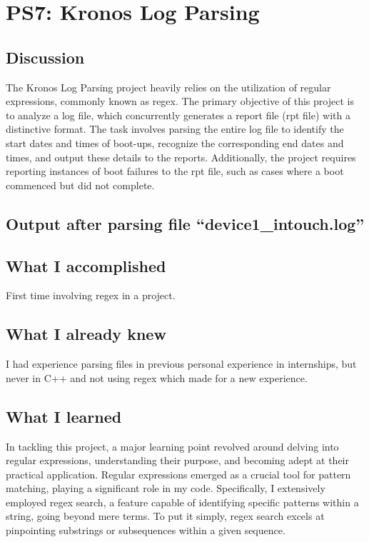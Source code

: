 \section{PS7: Kronos Log Parsing}\label{sec:ps7}

\subsection{Discussion}\label{sec:ps7:disc}

The Kronos Log Parsing project heavily relies on the utilization of regular expressions, commonly known as regex. The primary objective of this project is to analyze a log file, which concurrently generates a report file (rpt file) with a distinctive format. The task involves parsing the entire log file to identify the start dates and times of boot-ups, recognize the corresponding end dates and times, and output these details to the reports. Additionally, the project requires reporting instances of boot failures to the rpt file, such as cases where a boot commenced but did not complete.

\subsection{Output after parsing file ``device1\_intouch.log''}\label{sec:ps7:output}



\subsection{What I accomplished}\label{sec:ps7:accomplish}

First time involving regex in a project.

\subsection{What I already knew}\label{sec:ps7:knew}

I had experience parsing files in previous personal experience in internships, but never in C++ and not using regex which made for a new experience.

\subsection{What I learned}\label{sec:ps7:learned}

In tackling this project, a major learning point revolved around delving into regular expressions, understanding their purpose, and becoming adept at their practical application. Regular expressions emerged as a crucial tool for pattern matching, playing a significant role in my code. Specifically, I extensively employed regex search, a feature capable of identifying specific patterns within a string, going beyond mere terms. To put it simply, regex search excels at pinpointing substrings or subsequences within a given sequence.

